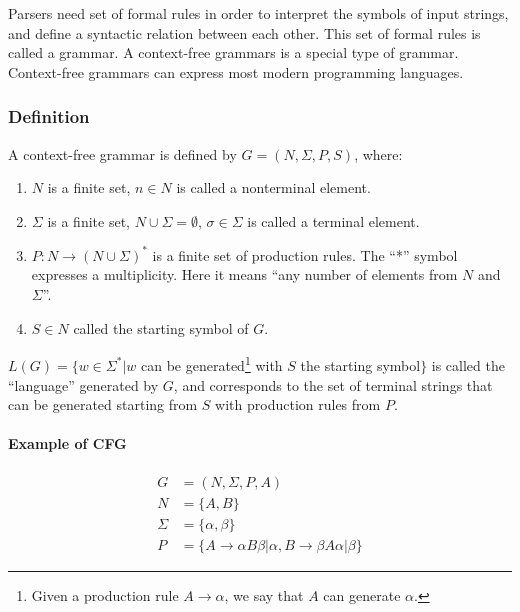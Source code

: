 \documentclass[twocolumn]{article}
\begin{document}
Parsers need set of formal rules in order to interpret the symbols of input
strings, and define a syntactic
relation between each other. This set of formal rules is called a grammar.
A context-free grammars is a special type of grammar. Context-free grammars can
express most modern programming languages.

\subsubsection{Definition}
A context-free grammar is defined by $G=(N,\Sigma,P,S)$, where:\\
\begin{enumerate}
  \item $N$ is a finite set, $n\in N$ is called a nonterminal element.
  \item $\Sigma$ is a finite set, $N\cup\Sigma=\emptyset$, $\sigma\in\Sigma$ is called a terminal element.
  \item $P:N\rightarrow (N\cup \Sigma)^*$ is a finite set of production rules.
    The ``*'' symbol expresses a multiplicity. Here it means ``any number of elements from
    $N$ and $\Sigma$''.
  \item $S\in N$ called the starting symbol of $G$.
\end{enumerate}
$L(G)=\{w\in \Sigma^*|w$ can be generated\footnote{Given a production rule
  $A\rightarrow \alpha$, we say that $A$ can generate $\alpha$.} with $S$ the starting symbol$\}$
is called the ``language'' generated by $G$, and corresponds to the set of
terminal strings that can be generated starting from $S$ with production rules
from $P$.

\paragraph{Example of CFG} 
\begin{align*}
  G&=(N,\Sigma,P,A)\\
  N&=\{A,B\}\\
  \Sigma&=\{\alpha,\beta\}\\
  P&=\{A\rightarrow\alpha B\beta | \alpha, B\rightarrow\beta A\alpha | \beta\}
\end{align*}
\end{document}
